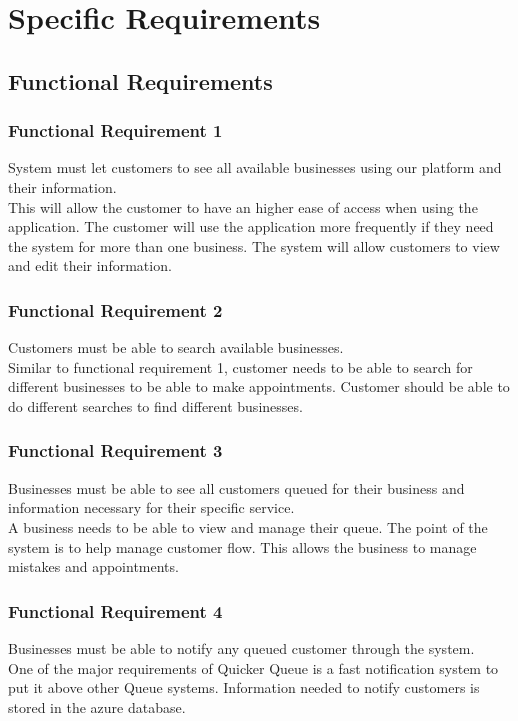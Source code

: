 \documentclass{scrreprt}
\begin{document}
\chapter{Specific Requirements}

\section{Functional Requirements}

\subsection{Functional Requirement 1}
System must let customers to see all available businesses using our platform and their information.\\ This will allow the customer to have an higher ease of access when using the application. The customer will use the application more frequently if they need the system for more than one business. The system will allow customers to view and edit their information.
\subsection{Functional Requirement 2}
Customers must be able to search available businesses.\\ Similar to functional requirement 1, customer needs to be able to search for different businesses to be able to make appointments. Customer should be able to do different searches to find different businesses.

\subsection{Functional Requirement 3}
Businesses must be able to see all customers queued for their business and information necessary for their specific service.\\ A business needs to be able to view and manage their queue. The point of the system is to help manage customer flow. This allows the business to manage mistakes and appointments.
\subsection{Functional Requirement 4}
Businesses must be able to notify any queued customer through the system.\\ One of the major requirements of Quicker Queue is a fast notification system to put it above other Queue systems. Information needed to notify customers is stored in the azure database.
\end{document}
